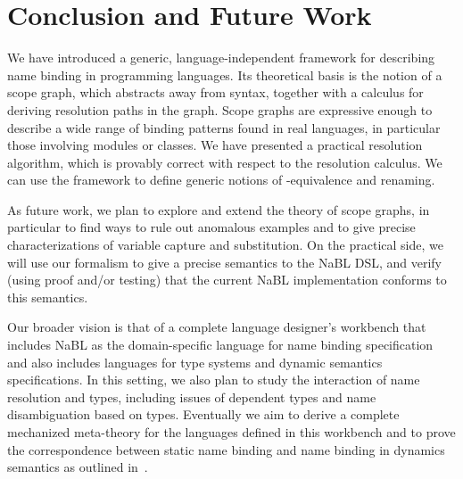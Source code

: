 \section{Conclusion and Future Work}\label{conclusion}

We have introduced a generic, language-independent framework for describing name
binding in programming languages.
Its theoretical basis is the notion of a scope graph, which abstracts away from
syntax, together with a calculus for deriving resolution paths in the graph. 
Scope graphs are expressive enough to describe a wide range of binding patterns
found in real languages, in particular those involving modules or classes.  We
have presented a practical resolution algorithm, which is provably correct with
respect to the resolution calculus. We can use the framework to define generic
notions of \a-equivalence and renaming.

As future work, we plan to explore and extend the theory of scope graphs, in
particular to find ways to rule out anomalous examples and to give precise
characterizations of variable capture and substitution.
On the practical side, we will use our formalism to give a precise semantics to
the NaBL DSL, and verify (using proof and/or testing) that the current NaBL
implementation conforms to this semantics.

Our broader vision is that of a complete language designer's workbench that
includes NaBL as the domain-specific language for name binding specification and
also includes languages for type systems and dynamic semantics specifications.
In this setting, we also plan to study the interaction of name resolution and
types, including issues of dependent types and name disambiguation based on
types. Eventually we aim to derive a complete mechanized meta-theory for the
languages defined in this workbench and to prove the correspondence between static
name binding and name binding in dynamics semantics as outlined
in~\cite{VisserOnward14}.


